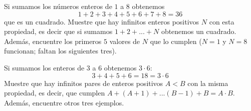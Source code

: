 \begin{sol}
    
\end{sol}

\begin{prob}[3 pts.]
    Si sumamos los números enteros de $1$ a $8$ obtenemos
    \[1+2+3+4+5+6+7+8=36\]
    que es un cuadrado. Muestre que hay infinitos enteros positivos $N$ con esta propiedad, es decir que si sumamos $1+2+...+N$ obtenemos un cuadrado. Además, encuentre los primeros $5$ valores de $N$ que lo cumplen ($N=1$ y $N=8$ funcionan; faltan los siguientes tres).
\end{prob}

\begin{sol}
    
\end{sol}

\begin{prob}[3 pts]
    Si sumamos los enteros de $3$ a $6$ obtenemos $3\cdot 6$:
    \[3+4+5+6=18=3\cdot 6\]
    Muestre que hay infinitos pares de enteros positivos $A<B$ con la misma propiedad, es decir, que cumplen $A+(A+1)+...(B-1)+B=A\cdot B$. Además, encuentre otros tres ejemplos.
\end{prob}

\begin{sol}
    
\end{sol}

